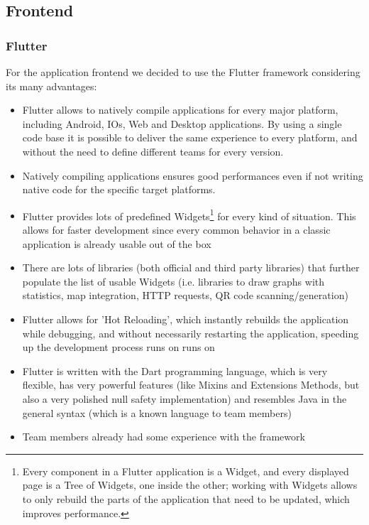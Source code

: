 \clearpage

\subsection{Frontend}
\subsubsection{Flutter}

For the application frontend we decided to use the Flutter framework considering its many advantages:
\begin{itemize}
    \item Flutter allows to natively compile applications for every major platform, including Android, IOs, Web and Desktop applications. By using a single code base it is possible to deliver the same experience to every platform, and without the need to define different teams for every version.
    \item Natively compiling applications ensures good performances even if not writing native code for the specific target platforms.
    \item Flutter provides lots of predefined Widgets\footnote{Every component in a Flutter application is a Widget, and every displayed page is a Tree of Widgets, one inside the other; working with Widgets allows to only rebuild the parts of the application that need to be updated, which improves performance.} for every kind of situation. This allows for faster development since every common behavior in a classic application is already usable out of the box
    \item There are lots of libraries (both official and third party libraries) that further populate the list of usable Widgets (i.e. libraries to draw graphs with statistics, map integration, HTTP requests, QR code scanning/generation)
    \item Flutter allows for 'Hot Reloading', which instantly rebuilds the application while debugging, and without necessarily restarting the application, speeding up the development process runs on runs on
    \item Flutter is written with the Dart programming language, which is very flexible, has very powerful features (like Mixins and Extensions Methods, but also a very polished null safety implementation) and resembles Java in the general syntax (which is a known language to team members)
    \item Team members already had some experience with the framework
\end{itemize}

